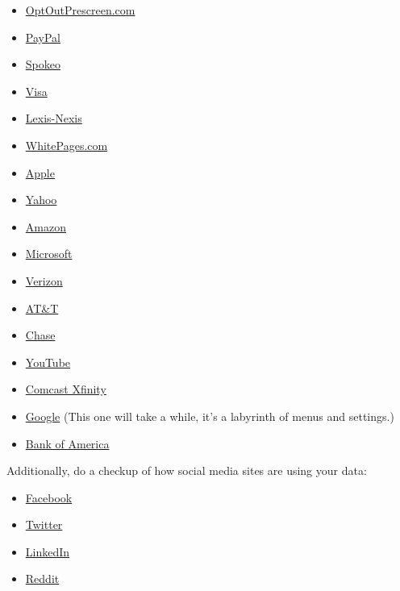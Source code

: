 \begin{itemize}
\item
  \href{https://simpleoptout.com/\#optoutprescreen.com}{OptOutPrescreen.com}
\item
  \href{https://simpleoptout.com/\#paypal}{PayPal}
\item
  \href{https://simpleoptout.com/\#spokeo}{Spokeo}
\item
  \href{https://simpleoptout.com/\#visa}{Visa}
\item
  \href{https://simpleoptout.com/\#lexis-nexis}{Lexis-Nexis}
\item
  \href{https://simpleoptout.com/\#whitepages.com}{WhitePages.com}
\item
  \href{https://simpleoptout.com/\#apple}{Apple}
\item
  \href{https://simpleoptout.com/\#yahoo/oath}{Yahoo}
\item
  \href{https://simpleoptout.com/\#amazon.com}{Amazon}
\item
  \href{https://simpleoptout.com/\#microsoft}{Microsoft}
\item
  \href{https://simpleoptout.com/\#verizon}{Verizon}
\item
  \href{https://simpleoptout.com/\#at\&t}{AT\&T}
\item
  \href{https://simpleoptout.com/\#chase}{Chase}
\item
  \href{https://simpleoptout.com/\#youtube}{YouTube}
\item
  \href{https://simpleoptout.com/\#comcast-xfinity}{Comcast Xfinity}
\item
  \href{https://simpleoptout.com/\#google}{Google} (This one will take a
  while, it's a labyrinth of menus and settings.)
\item
  \href{https://simpleoptout.com/\#bank-of-america}{Bank of America}
\end{itemize}

Additionally, do a checkup of how social media sites are using your
data:

\begin{itemize}
\item
  \href{https://simpleoptout.com/\#facebook}{Facebook}
\item
  \href{https://simpleoptout.com/\#twitter}{Twitter}
\item
  \href{https://simpleoptout.com/\#linkedin}{LinkedIn}
\item
  \href{https://simpleoptout.com/\#reddit}{Reddit}
\end{itemize}

